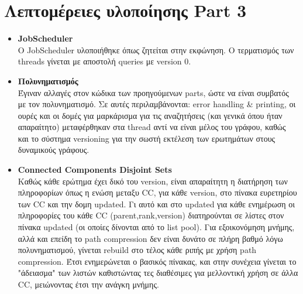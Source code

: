\documentclass[11pt]{article}
\begin{document}
\section{Λεπτομέρειες υλοποίησης Part 3}
\begin{itemize}
\item \textbf{JobScheduler}\\
Ο JobScheduler υλοποιήθηκε όπως ζητείται στην εκφώνηση. Ο τερματισμός των threads γίνεται με αποστολή queries με version 0.
\item \textbf{Πολυνηματισμός}\\
Έγιναν αλλαγές στον κώδικα των προηγούμενων parts, ώστε να είναι συμβατός με τον πολυνηματισμό. Σε αυτές περιλαμβάνονται: error handling \& printing, οι ουρές και οι δομές για μαρκάρισμα για τις αναζητήσεις (και γενικά όπου ήταν απαραίτητο) μεταφέρθηκαν στα thread αντί να είναι μέλος του γράφου, καθώς και το σύστημα versioning για την σωστή εκτέλεση των ερωτημάτων στους δυναμικούς γράφους.
\item \textbf{Connected Components Disjoint Sets}\\
Καθώς κάθε ερώτημα έχει δικό του version, είναι απαραίτητη η διατήρηση των πληροφορίων όπως η ενώση μεταξυ CC, για κάθε version, στο πίνακα ευρετηρίου των CC και την δομη updated. Γι αυτό και στο updated για κάθε ενημέρωση οι πληροφορίες του κάθε CC (parent,rank,version) διατηρούνται σε λίστες στον πίνακα updated (οι οποίες δίνονται από το list pool). Για εξοικονόμηση μνήμης, αλλά και επείδη το path compression δεν είναι δυνάτο σε πλήρη βαθμό λόγω πολυνηματισμού, γίνεται rebuild στο τέλος κάθε ριπής με χρήση path compression. Έτσι ενημερώνεται ο βασικός πίνακας, και στην συνέχεια γίνεται το "άδειασμα" των λιστών καθιστώντας τες διαθέσιμες για μελλοντική χρήση σε άλλα CC, μειώνοντας έτσι την ανάγκη μνήμης. 

\end{itemize}
\end{document}
